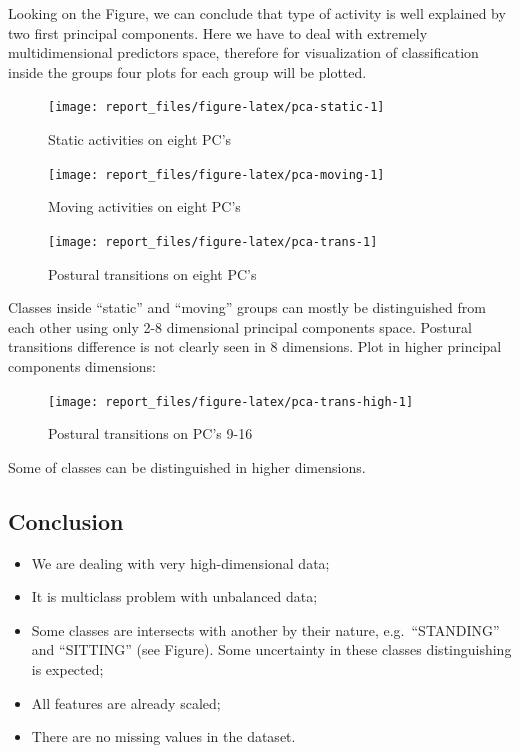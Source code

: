 \documentclass[
]{article}
\providecommand{\tightlist}{%
  \setlength{\itemsep}{0pt}\setlength{\parskip}{0pt}}
\begin{document}
Looking on the Figure, we can conclude that type of activity is well
explained by two first principal components. Here we have to deal with
extremely multidimensional predictors space, therefore for visualization
of classification inside the groups four plots for each group will be
plotted.

\begin{figure}

{\centering \texttt{[image: report\_files/figure-latex/pca-static-1]} 

}

\caption{Static activities on eight PC's}\label{fig:pca-static}
\end{figure}
\begin{figure}

{\centering \texttt{[image: report\_files/figure-latex/pca-moving-1]} 

}

\caption{Moving activities on eight PC's}\label{fig:pca-moving}
\end{figure}
\begin{figure}

{\centering \texttt{[image: report\_files/figure-latex/pca-trans-1]} 

}

\caption{Postural transitions on eight PC's}\label{fig:pca-trans}
\end{figure}

Classes inside ``static'' and ``moving'' groups can mostly be
distinguished from each other using only 2-8 dimensional principal
components space. Postural transitions difference is not clearly seen in
8 dimensions. Plot in higher principal components dimensions:

\begin{figure}

{\centering \texttt{[image: report\_files/figure-latex/pca-trans-high-1]} 

}

\caption{Postural transitions on PC's 9-16}\label{fig:pca-trans-high}
\end{figure}

Some of classes can be distinguished in higher dimensions.

\hypertarget{conclusion}{%
\subsection{Conclusion}\label{conclusion}}

\begin{itemize}
\tightlist
\item
  We are dealing with very high-dimensional data;
\item
  It is multiclass problem with unbalanced data;
\item
  Some classes are intersects with another by their nature,
  e.g.~``STANDING'' and ``SITTING'' (see Figure). Some uncertainty in
  these classes distinguishing is expected;
\item
  All features are already scaled;
\item
  There are no missing values in the dataset.
\end{itemize}
\end{document}
